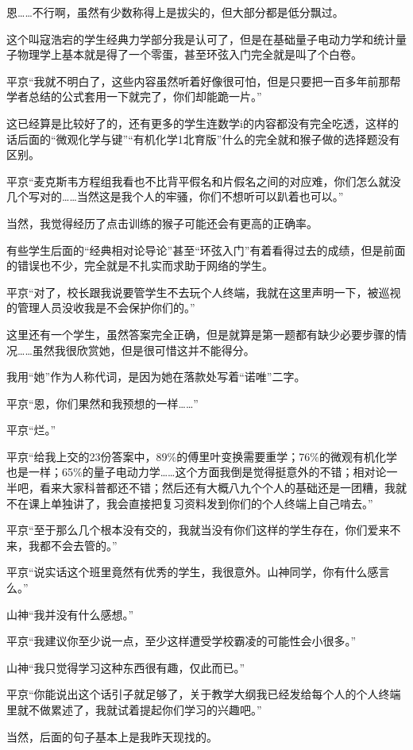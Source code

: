 恩……不行啊，虽然有少数称得上是拔尖的，但大部分都是低分飘过。


这个叫寇浩宕的学生经典力学部分我是认可了，但是在基础量子电动力学和统计量子物理学上基本就是得了一个零蛋，甚至环弦入门完全就是叫了个白卷。

平京“我就不明白了，这些内容虽然听着好像很可怕，但是只要把一百多年前那帮学者总结的公式套用一下就完了，你们却能跪一片。”

这已经算是比较好了的，还有更多的学生连数学i的内容都没有完全吃透，这样的话后面的“微观化学与键”“有机化学1北育版”什么的完全就和猴子做的选择题没有区别。

平京“麦克斯韦方程组我看也不比背平假名和片假名之间的对应难，你们怎么就没几个写对的……当然这是我个人的牢骚，你们不想听可以趴着也可以。”

当然，我觉得经历了点击训练的猴子可能还会有更高的正确率。

有些学生后面的“经典相对论导论”甚至“环弦入门”有着看得过去的成绩，但是前面的错误也不少，完全就是不扎实而求助于网络的学生。

平京“对了，校长跟我说要管学生不去玩个人终端，我就在这里声明一下，被巡视的管理人员没收我是不会保护你们的。”

这里还有一个学生，虽然答案完全正确，但是就算是第一题都有缺少必要步骤的情况……虽然我很欣赏她，但是很可惜这并不能得分。

我用“她”作为人称代词，是因为她在落款处写着“诺唯”二字。

平京“恩，你们果然和我预想的一样……”

平京“烂。”

平京“给我上交的23份答案中，89\%的傅里叶变换需要重学；76\%的微观有机化学也是一样；65\%的量子电动力学……这个方面我倒是觉得挺意外的不错；相对论一半吧，看来大家科普都还不错；然后还有大概八九个个人的基础还是一团糟，我就不在课上单独讲了，我会直接把复习资料发到你们的个人终端上自己啃去。”

平京“至于那么几个根本没有交的，我就当没有你们这样的学生存在，你们爱来不来，我都不会去管的。”

平京“说实话这个班里竟然有优秀的学生，我很意外。山神同学，你有什么感言么。”

山神“我并没有什么感想。”

平京“我建议你至少说一点，至少这样遭受学校霸凌的可能性会小很多。”

山神“我只觉得学习这种东西很有趣，仅此而已。”

平京“你能说出这个话引子就足够了，关于教学大纲我已经发给每个人的个人终端里就不做累述了，我就试着提起你们学习的兴趣吧。”

当然，后面的句子基本上是我昨天现找的。

